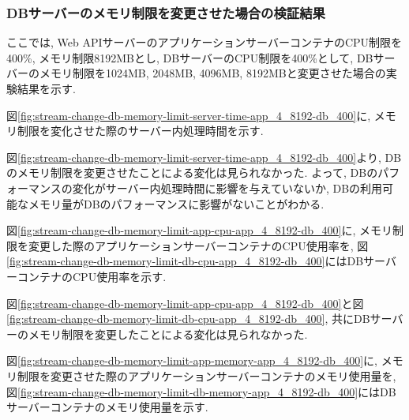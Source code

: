 \documentclass[../../../../main]{subfiles}
\begin{document}
    \subsubsection{DBサーバーのメモリ制限を変更させた場合の検証結果}\label{subsubsec:result-streaming-change-db-memory}

    ここでは, Web APIサーバーのアプリケーションサーバーコンテナのCPU制限を400\%, メモリ制限8192MBとし, DBサーバーのCPU制限を400\%として, DBサーバーのメモリ制限を1024MB, 2048MB, 4096MB, 8192MBと変更させた場合の実験結果を示す.


    図\ref{fig:stream-change-db-memory-limit-server-time-app_4_8192-db_400}に, メモリ制限を変化させた際のサーバー内処理時間を示す.

    

    図\ref{fig:stream-change-db-memory-limit-server-time-app_4_8192-db_400}より, DBのメモリ制限を変更させたことによる変化は見られなかった. よって, DBのパフォーマンスの変化がサーバー内処理時間に影響を与えていないか, DBの利用可能なメモリ量がDBのパフォーマンスに影響がないことがわかる.


    図\ref{fig:stream-change-db-memory-limit-app-cpu-app_4_8192-db_400}に, メモリ制限を変更した際のアプリケーションサーバーコンテナのCPU使用率を, 図\ref{fig:stream-change-db-memory-limit-db-cpu-app_4_8192-db_400}にはDBサーバーコンテナのCPU使用率を示す.

    

    

    図\ref{fig:stream-change-db-memory-limit-app-cpu-app_4_8192-db_400}と図\ref{fig:stream-change-db-memory-limit-db-cpu-app_4_8192-db_400}, 共にDBサーバーのメモリ制限を変更したことによる変化は見られなかった.


    図\ref{fig:stream-change-db-memory-limit-app-memory-app_4_8192-db_400}に, メモリ制限を変更させた際のアプリケーションサーバーコンテナのメモリ使用量を, 図\ref{fig:stream-change-db-memory-limit-db-memory-app_4_8192-db_400}にはDBサーバーコンテナのメモリ使用量を示す.

    

    
\end{document}
